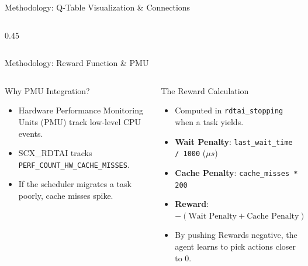 \documentclass[aspectratio=169]{beamer}
\begin{document}
\begin{frame}{Methodology: Q-Table Visualization \& Connections}
\begin{columns}[T]
\begin{column}{0.45\textwidth}
        \end{column}
    \end{columns}
\end{frame}

\begin{frame}{Methodology: Reward Function \& PMU}
  \begin{columns}[T]
    
      \begin{block}{Why PMU Integration?}
\begin{itemize}\scriptsize\itemsep3pt
  \item Hardware Performance Monitoring Units (PMU) track low-level CPU events.
  \item SCX\_RDTAI tracks \texttt{PERF\_COUNT\_HW\_CACHE\_MISSES}.
  \item If the scheduler migrates a task poorly, cache misses spike.
\end{itemize}
\end{block}

\vspace{6pt}

\begin{block}{The Reward Calculation}
\begin{itemize}\scriptsize\itemsep3pt
  \item Computed in \texttt{rdtai\_stopping} when a task yields.
  \item \textbf{Wait Penalty}: \texttt{last\_wait\_time / 1000} ($\mu s$)
  \item \textbf{Cache Penalty}: \texttt{cache\_misses * 200}
  \item \textbf{Reward}: $-( \text{Wait Penalty} + \text{Cache Penalty} )$
  \item By pushing Rewards negative, the agent learns to pick actions closer to 0.
\end{itemize}
\end{block}
      
      \centering
      \vspace{2pt}
      

\end{columns}
\end{frame}
\end{document}
